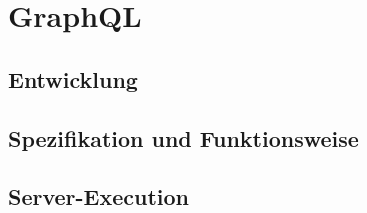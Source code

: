 \section{GraphQL}

\subsection{Entwicklung}

\subsection{Spezifikation und Funktionsweise}

\subsection{Server-Execution}
